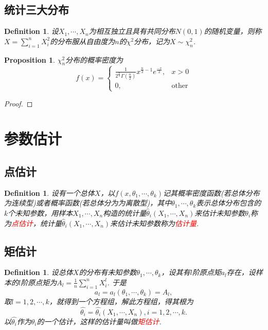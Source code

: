 \documentclass{article}
\newtheorem{proposition}[theorem]{Proposition}
\newtheorem{definition}[theorem]{Definition}
\newcommand{\redt}[1]{\textcolor{red}{#1}}
\begin{document}
\subsection{统计三大分布}

\begin{definition}
\rm 设$X_1,\cdots,X_n$为相互独立且具有共同分布$N(0,1)$的随机变量，则称$X=\sum\limits_{i=1}^n X_i^2$的分布服从自由度为$n$的$\chi ^2$分布，记为$X \sim \chi_n^2$.
\end{definition}

\begin{proposition}
\rm $\chi_n^2$分布的概率密度为
$$
f(x) =  \left\{
\begin{array}{ll}
\frac{1}{2^\frac{n}{2}\Gamma(\frac{n}{2})} x^{\frac{n}{2}-1}e^{\frac{-x}{2}}, & x > 0 \\
0, & \text{other}
\end{array} \right. 
$$
\end{proposition}

\begin{proof}
\rm 
\end{proof}


\newpage
\section{参数估计}

\subsection{点估计}

\begin{definition}
\rm 设有一个总体$X$，以$f(x,\theta_1,\cdots,\theta_k)$记其概率密度函数(若总体分布为连续型)或者概率函数(若总体分为为离散型)，其中$\theta_1,\cdots,\theta_k$表示总体分布包含的$k$个未知参数，用样本$X_1,\cdots,X_n$构造的统计量$\widehat{\theta}_i(X_1,\cdots,X_n)$来估计未知参数$\theta_i$称为\redt{点估计}，统计量$\widehat{\theta}_i(X_1,\cdots,X_n)$来估计未知参数称为\redt{估计量}.
\end{definition}

\subsection{矩估计}

\begin{definition}
\rm 设总体$X$的分布有未知参数$\theta_1,\cdots,\theta_k$，设其有$l$阶原点矩$a_l$存在，设样本的$l$阶原点矩为$A_l = \frac{1}{n}\sum\limits_{i = 1}^nX_i^l$. 于是
$$
a_l=a_l(\theta_1,\cdots,\theta_k) = A_l,
$$
取$l=1,2,\cdots,k$，就得到一个方程组，解此方程组，得其根为
$$
\widehat{\theta_i} = \widehat{\theta_i}(X_1,\cdots,X_n),i=1,2,\cdots,k.
$$
以$\widehat{\theta_i}$作为$\theta_i$的一个估计，这样的估计量叫做\redt{矩估计}.
\end{definition}
\end{document}
